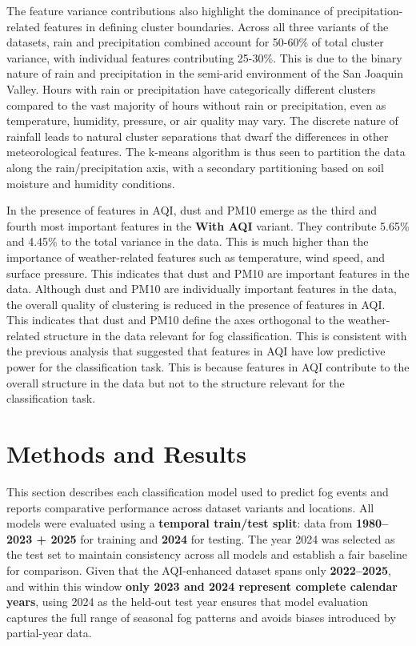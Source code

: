 \documentclass[
  letterpaper,
  DIV=11,
  numbers=noendperiod]{scrartcl}
\begin{document}
The feature variance contributions also highlight the dominance of
precipitation-related features in defining cluster boundaries. Across
all three variants of the datasets, rain and precipitation combined
account for 50-60\% of total cluster variance, with individual features
contributing 25-30\%. This is due to the binary nature of rain and
precipitation in the semi-arid environment of the San Joaquin Valley.
Hours with rain or precipitation have categorically different clusters
compared to the vast majority of hours without rain or precipitation,
even as temperature, humidity, pressure, or air quality may vary. The
discrete nature of rainfall leads to natural cluster separations that
dwarf the differences in other meteorological features. The k-means
algorithm is thus seen to partition the data along the
rain/precipitation axis, with a secondary partitioning based on soil
moisture and humidity conditions.

In the presence of features in AQI, dust and PM10 emerge as the third
and fourth most important features in the \textbf{With AQI} variant.
They contribute 5.65\% and 4.45\% to the total variance in the data.
This is much higher than the importance of weather-related features such
as temperature, wind speed, and surface pressure. This indicates that
dust and PM10 are important features in the data. Although dust and PM10
are individually important features in the data, the overall quality of
clustering is reduced in the presence of features in AQI. This indicates
that dust and PM10 define the axes orthogonal to the weather-related
structure in the data relevant for fog classification. This is
consistent with the previous analysis that suggested that features in
AQI have low predictive power for the classification task. This is
because features in AQI contribute to the overall structure in the data
but not to the structure relevant for the classification task.

\section{Methods and Results}\label{methods-and-results}

This section describes each classification model used to predict fog
events and reports comparative performance across dataset variants and
locations. All models were evaluated using a \textbf{temporal train/test
split}: data from \textbf{1980--2023 + 2025} for training and
\textbf{2024} for testing. The year 2024 was selected as the test set to
maintain consistency across all models and establish a fair baseline for
comparison. Given that the AQI-enhanced dataset spans only
\textbf{2022--2025}, and within this window \textbf{only 2023 and 2024
represent complete calendar years}, using 2024 as the held-out test year
ensures that model evaluation captures the full range of seasonal fog
patterns and avoids biases introduced by partial-year data.
\end{document}
